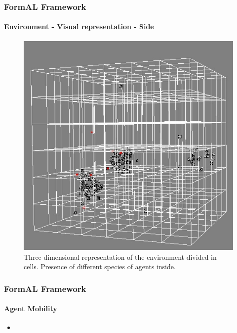 \frame
{
	\frametitle{FormAL Framework}
	\framesubtitle{Environment - Visual representation - Side}

	\begin{figure}[H]
		\centering
		\includegraphics[scale=0.40]{../tex/images/cells-side}
		\caption{Three dimensional representation of the environment divided in cells. Presence of different species of agents inside.}
	\label{tab:3-d-environment-images-3}
	\end{figure}	
}

\frame
{
	\frametitle{FormAL Framework}
	\framesubtitle{Agent Mobility}
	
	\begin{itemize}
		\item 
	\end{itemize}

}


